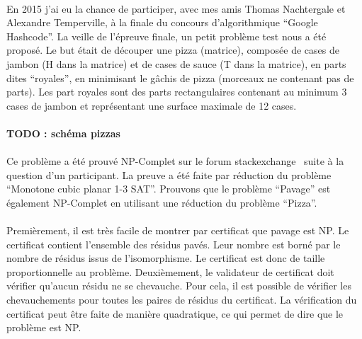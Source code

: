 \documentclass[12pt,french,twoside]{report}
\begin{document}
\paragraph{}En 2015 j'ai eu la chance de participer, avec mes amis Thomas Nachtergale et Alexandre Temperville, à la finale du concours d'algorithmique ``Google Hashcode''.
La veille de l'épreuve finale, un petit problème test nous a été proposé.
Le but était de découper une pizza (matrice), composée de cases de jambon (H dans la matrice) et de cases de sauce (T dans la matrice), en parts dites ``royales'', en minimisant le gâchis de pizza (morceaux ne contenant pas de parts).
Les part royales sont des parts rectangulaires contenant au minimum 3 cases de jambon et représentant une surface maximale de 12 cases.

\paragraph{TODO : schéma pizzas}

\paragraph{}Ce problème a été prouvé NP-Complet sur le forum stackexchange~\cite{de_biasi_complexity_2015} suite à la question d'un participant.
La preuve a été faite par réduction du problème ``Monotone cubic planar 1-3 SAT''.
Prouvons que le problème ``Pavage'' est également NP-Complet en utilisant une réduction du problème ``Pizza''.

\paragraph{}Premièrement, il est très facile de montrer par certificat que pavage est NP.
Le certificat contient l'ensemble des résidus pavés.
Leur nombre est borné par le nombre de résidus issus de l'isomorphisme.
Le certificat est donc de taille proportionnelle au problème.
Deuxièmement, le validateur de certificat doit vérifier qu'aucun résidu ne se chevauche.
Pour cela, il est possible de vérifier les chevauchements pour toutes les paires de résidus du certificat.
La vérification du certificat peut être faite de manière quadratique, ce qui permet de dire que le problème est NP.
\end{document}
